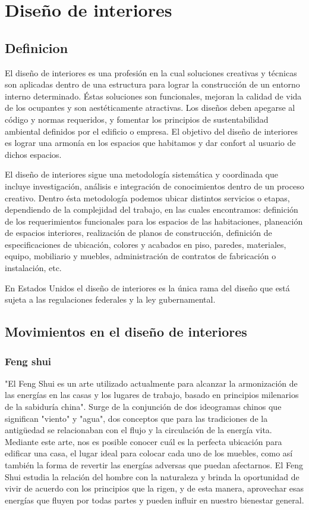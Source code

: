 \section{Diseño de interiores}
\subsection{Definicion}
El diseño de interiores es una profesión en la cual soluciones creativas y técnicas son aplicadas dentro de una estructura para lograr la construcción de un entorno interno determinado. Éstas soluciones son funcionales, mejoran la calidad de vida de los ocupantes y son aestéticamente atractivas. Los diseños deben apegarse al código y normas requeridos, y fomentar los principios de sustentabilidad ambiental definidos por el edificio o empresa. El objetivo del diseño de interiores es lograr una armonía en los espacios que habitamos y dar confort al usuario de dichos espacios\cite{B01}. \par
El diseño de interiores sigue una metodología sistemática y coordinada que incluye investigación, análisis e integración de conocimientos dentro de un proceso creativo. Dentro ésta metodología podemos ubicar distintos servicios o etapas, dependiendo de la complejidad del trabajo, en las cuales encontramos: definición de los requerimientos funcionales para los espacios de las habitaciones, planeación de espacios interiores, realización de planos de construcción, definición de especificaciones de ubicación, colores y acabados en piso, paredes, materiales, equipo, mobiliario y muebles, administración de contratos de fabricación o instalación, etc.\par
En Estados Unidos el diseño de interiores es la única rama del diseño que está sujeta a las regulaciones federales y la ley gubernamental\cite{B02}.
\subsection{Movimientos en el diseño de interiores}

\subsubsection{Feng shui}
"El Feng Shui es un arte utilizado actualmente para alcanzar la armonización de las energías en las casas y los lugares de trabajo, basado en principios milenarios de la sabiduría china"\cite{B26}. Surge de la conjunción de dos ideogramas chinos que significan "viento" y "agua", dos conceptos que para las tradiciones de la antigüedad se relacionaban con el flujo y la circulación de la energía vita. Mediante este arte, nos es posible conocer cuál es la perfecta ubicación para edificar una casa, el lugar ideal para colocar cada uno de los muebles, como así también la forma de revertir las energías adversas que puedan afectarnos. El Feng Shui estudia la relación del hombre con la naturaleza y brinda la oportunidad de vivir de acuerdo con los principios que la rigen, y de esta manera, aprovechar esas energías que fluyen por todas partes y pueden influir en nuestro bienestar general.


